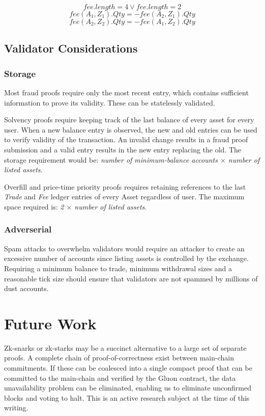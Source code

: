 \documentclass[12pt,a4paper]{article}
\begin{document}
\begin{equation}
    fee.length = 4 \lor fee.length = 2
\end{equation}
\begin{equation}
fee(A_1,Z_1).Qty = -fee(A_2,Z_1).Qty
\end{equation}
\begin{equation}
fee(A_2,Z_2).Qty = -fee(A_1,Z_2).Qty
\end{equation}
\subsection{Validator Considerations}

\subsubsection{Storage}
Most fraud proofs require only the most recent entry, which contains sufficient information to prove its validity. These can be statelessly validated.

Solvency proofs require keeping track of the last balance of every asset for every user. When a new balance entry is observed, the new and old entries can be used to verify validity of the transaction. An invalid change results in a fraud proof submission and a valid entry results in the new entry replacing the old. The storage requirement would be: \emph{number of minimum-balance accounts $\times$ number of listed assets}.

Overfill and price-time priority proofs requires retaining references to the last \emph{Trade} and \emph{Fee} ledger entries of every Asset regardless of user. The maximum space required is: \emph{2 $\times$ number of listed assets}.

\subsubsection{Adverserial} Spam attacks to overwhelm validators would require an attacker to create an excessive number of accounts since listing assets is controlled by the exchange. Requiring a minimum balance to trade, minimum withdrawal sizes and a reasonable tick size should ensure that validators are not spammed by millions of dust accounts.

\section*{Future Work}
Zk-snarks or zk-starks may be a succinct alternative to a large set of separate proofs. A complete chain of proof-of-correctness exist between main-chain commitments. If these can be coalesced into a single compact proof that can be committed to the main-chain and verified by the Gluon contract, the data unavailability problem can be eliminated, enabling us to eliminate unconfirmed blocks and voting to halt. This is an active research subject at the time of this writing.
\end{document}
